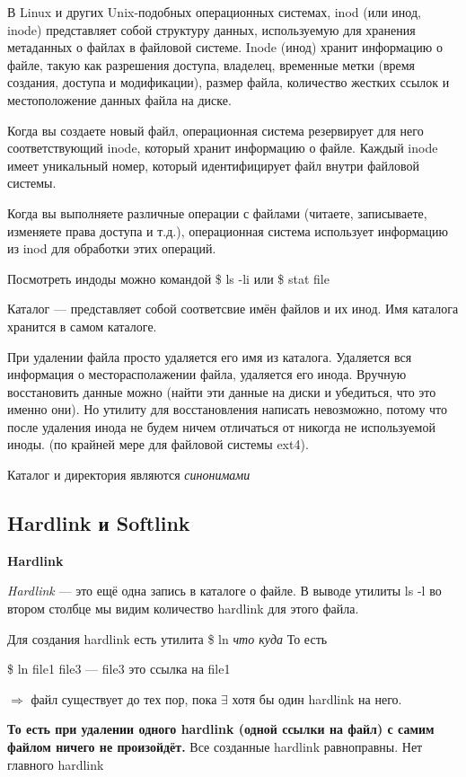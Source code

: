 \documentclass[oneside, final, 14pt]{extreport} %
\begin{document}
В Linux и других Unix-подобных операционных системах, inod (или инод, inode) представляет собой структуру данных, используемую для хранения метаданных о файлах в файловой системе. Inode (инод) хранит информацию о файле, такую как разрешения доступа, владелец, временные метки (время создания, доступа и модификации), размер файла, количество жестких ссылок и местоположение данных файла на диске.

Когда вы создаете новый файл, операционная система резервирует для него соответствующий inode, который хранит информацию о файле. Каждый inode имеет уникальный номер, который идентифицирует файл внутри файловой системы.

Когда вы выполняете различные операции с файлами (читаете, записываете, изменяете права доступа и т.д.), операционная система использует информацию из inod для обработки этих операций.

Посмотреть индоды можно командой \$ ls -li или \$ stat file

Каталог --- представляет собой соответсвие имён файлов и их инод. Имя каталога хранится в самом каталоге.

\vspace{\baselineskip}
При удалении файла просто удаляется его имя из каталога. Удаляется вся информация
о месторасполажении файла, удаляется его инода. Вручную восстановить данные можно (найти 
эти данные на диски и убедиться, что это именно они). Но утилиту для восстановления написать невозможно, 
потому что после удаления инода не будем ничем отличаться от никогда не используемой иноды.
(по крайней мере для файловой системы ext4).

Каталог и директория являются \textit{синонимами}

\subsection{Hardlink и Softlink}

\textbf{Hardlink}

\textit{Hardlink} --- это ещё одна запись в каталоге о файле. В выводе утилиты ls -l во втором
столбце мы видим количество hardlink для этого файла.

Для создания hardlink есть утилита \$ ln \textit{что куда}
То есть 

\$ ln file1 file3 --- file3 это ссылка на file1

$ \Rightarrow $ файл существует до тех пор, пока $ \exists $ хотя бы один hardlink на него.

\textbf{То есть при удалении одного hardlink (одной ссылки на файл) с самим файлом ничего не произойдёт.}
Все созданные hardlink равноправны. Нет главного hardlink
\end{document}

